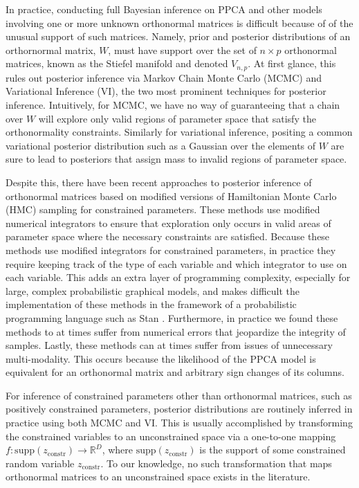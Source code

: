 \documentclass{article}
\begin{document}
In practice, conducting full Bayesian inference on PPCA and other models involving one or more unknown orthonormal matrices is difficult because of of the unusual support of such matrices. Namely, prior and posterior distributions of an orthornormal matrix, $W$, must have support over the set of $n \times p$ orthonormal matrices, known as the Stiefel manifold and denoted $V_{n,p}$. At first glance, this rules out posterior inference via Markov Chain Monte Carlo (MCMC) and Variational Inference (VI), the two most prominent techniques for posterior inference. Intuitively, for MCMC, we have no way of guaranteeing that a chain over $W$ will explore only valid regions of parameter space that satisfy the orthonormality constraints. Similarly for variational inference, positing a common variational posterior distribution such as a Gaussian over the elements of $W$ are sure to lead to posteriors that assign mass to invalid regions of parameter space.

Despite this, there have been recent approaches to posterior inference of orthonormal matrices based on modified versions of Hamiltonian Monte Carlo (HMC) sampling for constrained parameters. These methods use modified numerical integrators to ensure that exploration only occurs in valid areas of parameter space where the necessary constraints are satisfied. Because these methods use modified integrators for constrained parameters, in practice they require keeping track of the type of each variable and which integrator to use on each variable. This adds an extra layer of programming complexity, especially for large, complex probabilistic graphical models, and makes difficult the implementation of these methods in the framework of a probabilistic programming language such as Stan \citep{carpenter2016stan}. Furthermore, in practice we found these methods to at times suffer from numerical errors that jeopardize the integrity of samples. Lastly, these methods can at times suffer from issues of unnecessary multi-modality. This occurs because the likelihood of the PPCA model is equivalent for an orthonormal matrix and arbitrary sign changes of its columns.

For inference of constrained parameters other than orthonormal matrices, such as positively constrained parameters, posterior distributions are routinely inferred in practice using both MCMC and VI. This is usually accomplished by transforming the constrained variables to an unconstrained space via a one-to-one mapping $f: \mathrm{supp}(z_\mathrm{constr}) \to \mathbb{R}^D$, where $\mathrm{supp}(z_\mathrm{constr})$ is the support of some constrained random variable $z_\mathrm{constr}$. To our knowledge, no such transformation that maps orthonormal matrices to an unconstrained space exists in the literature.
\end{document}
